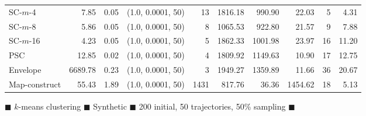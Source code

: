 \begin{figure}
\begin{center}
\begin{minipage}{\textwidth}
{\begin{tabular}{@{}lrrcrrrrrr@{}}
        SC-$m$-4 & 7.85 & 0.05 & (1.0, 0.0001, 50) & 13 & 1816.18 & 990.90 & 22.03 & 5 & 4.31\\
        SC-$m$-8 & 5.86 & 0.05 & (1.0, 0.0001, 50) & 8 & 1065.53 & 922.80 & 21.57 & 9 & 7.88\\
        SC-$m$-16 & 4.23 & 0.05 & (1.0, 0.0001, 50) & 5 & 1862.33 & 1001.98 & 23.97 & 16 & 11.20\\
        PSC & 12.85 & 0.02 & (1.0, 0.0001, 50) & 4 & 1809.92 & 1149.63 & 10.90 & 17 & 12.75\\
        Envelope & 6689.78 & 0.23 & (1.0, 0.0001, 50) & 3 & 1949.27 & 1359.89 & 11.66 & 36 & 20.67\\
        Map-construct & 55.43 & 1.89 & (1.0, 0.0001, 50) & 1431 & 817.76 & 36.36 & 1454.62 & 18 & 5.13\\
        \bottomrule
    \end{tabular}
    }
  \end{minipage}
  \end{center}
        \caption{
        $\blacksquare$ $k$-means clustering $\blacksquare$ Synthetic $\blacksquare$ 200 initial, 50 trajectories, 50\% sampling $\blacksquare$}
 \end{figure}